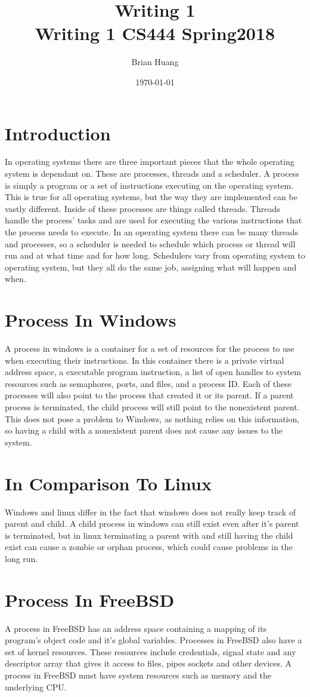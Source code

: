 \documentclass[onecolumn, draftclsnofoot, 10pt, titlepage, compsoc]{IEEEtran}
\title
{%
	Writing 1 \\
	\vspace{0.4cm}
	\large Writing 1
	\vspace{0.4cm}
	\large CS444 Spring2018
}
\author{Brian Huang}
\date{\today}
\begin{document}
\maketitle

\section{Introduction}
In operating systems there are three important pieces that the whole operating system is dependant on. These are processes, threads and a scheduler. A process is simply a program or a set of instructions executing on the operating system. This is true for all operating systems, but the way they are implemented can be vastly different. Inside of these processes are things called threads. Threads handle the process’ tasks and are used for executing the various instructions that the process needs to execute. In an operating system there can be many threads and processes, so a scheduler is needed to schedule which process or thread will run and at what time and for how long. Schedulers vary from operating system to operating system, but they all do the same job, assigning what will happen and when.
\section{Process In Windows}
A process in windows is a container for a set of resources for the process to use when executing their instructions. In this container there is a private virtual address space, a executable program instruction, a list of open handles to system resources such as semaphores, ports, and files, and a process ID. Each of these processes will also point to the process that created it or its parent. If a parent process is terminated, the child process will still point to the nonexistent parent. This does not pose a problem to Windows, as nothing relies on this information, so having a child with a nonexistent parent does not cause any issues to the system.
\section{In Comparison To Linux}
Windows and linux differ in the fact that windows does not really keep track of parent and child. A child process in windows can still exist even after it’s parent is terminated, but in linux terminating a parent with and still having the child exist can cause a zombie or orphan process, which could cause problems in the long run.
\section{Process In FreeBSD}
A process in FreeBSD has an address space containing a mapping of its program’s object code and it’s global variables. Processes in FreeBSD also have a set of kernel resources. These resources include credentials, signal state and any descriptor array that gives it access to files, pipes sockets and other devices. A process in FreeBSD must have system resources such as memory and the underlying CPU.
\end{document}
